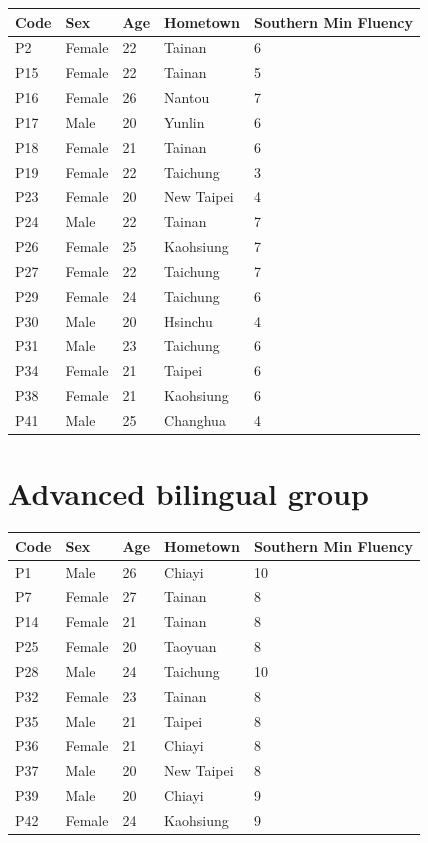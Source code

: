 \documentclass[12pt]{report}
\begin{document}
\begin{CJK}{UTF8}{bsmi}
\begin{flushleft}
\begin{table}[hbt!]
\begin{tabularx}{\textwidth}{|l||X|X|X|X|}
\hline
Code&Sex&Age&Hometown&Southern Min Fluency\\
\hline
\hline
P2&Female&22&Tainan&6\\
\hline
P15&Female&22&Tainan&5\\
\hline
P16&Female&26&Nantou&7\\
\hline
P17&Male&20&Yunlin&6\\
\hline
P18&Female&21&Tainan&6\\
\hline
P19&Female&22&Taichung&3\\
\hline
P23&Female&20&New Taipei&4\\
\hline
P24&Male&22&Tainan&7\\
\hline
P26&Female&25&Kaohsiung&7\\
\hline
P27&Female&22&Taichung&7\\
\hline
P29&Female&24&Taichung&6\\
\hline
P30&Male&20&Hsinchu&4\\
\hline
P31&Male&23&Taichung&6\\
\hline
P34&Female&21&Taipei&6\\
\hline
P38&Female&21&Kaohsiung&6\\
\hline
P41&Male&25&Changhua&4\\
\hline

\end{tabularx}
\end{table}
\end{flushleft}

\section{Advanced bilingual group}

\begin{flushleft}
\begin{table}[hbt!]
\begin{tabularx}{\textwidth}{|l||X|X|X|X|}
\hline
Code&Sex&Age&Hometown&Southern Min Fluency\\
\hline
\hline
P1&Male&26&Chiayi&10\\
\hline
P7&Female&27&Tainan&8\\
\hline
P14&Female&21&Tainan&8\\
\hline
P25&Female&20&Taoyuan&8\\
\hline
P28&Male&24&Taichung&10\\
\hline
P32&Female&23&Tainan&8\\
\hline
P35&Male&21&Taipei&8\\
\hline
P36&Female&21&Chiayi&8\\
\hline
P37&Male&20&New Taipei&8\\
\hline
P39&Male&20&Chiayi&9\\
\hline
P42&Female&24&Kaohsiung&9\\
\hline


\end{tabularx}
\end{table}
\end{flushleft}
\end{CJK}
\end{document}
